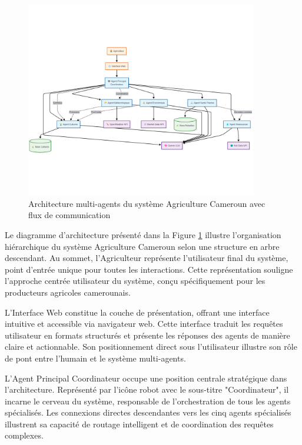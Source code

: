 \begin{figure}[H]
\centering
\includegraphics[width=0.9\textwidth]{images/architectures.png}
\caption{Architecture multi-agents du système Agriculture Cameroun avec flux de communication}
\label{fig:architecture}
\end{figure}

Le diagramme d'architecture présenté dans la Figure \ref{fig:architecture} illustre l'organisation hiérarchique du système Agriculture Cameroun selon une structure en arbre descendant. Au sommet, l'Agriculteur représente l'utilisateur final du système, point d'entrée unique pour toutes les interactions. Cette représentation souligne l'approche centrée utilisateur du système, conçu spécifiquement pour les producteurs agricoles camerounais.

L'Interface Web constitue la couche de présentation, offrant une interface intuitive et accessible via navigateur web. Cette interface traduit les requêtes utilisateur en formats structurés et présente les réponses des agents de manière claire et actionnable. Son positionnement direct sous l'utilisateur illustre son rôle de pont entre l'humain et le système multi-agents.

L'Agent Principal Coordinateur occupe une position centrale stratégique dans l'architecture. Représenté par l'icône robot avec le sous-titre "Coordinateur", il incarne le cerveau du système, responsable de l'orchestration de tous les agents spécialisés. Les connexions directes descendantes vers les cinq agents spécialisés illustrent sa capacité de routage intelligent et de coordination des requêtes complexes.

